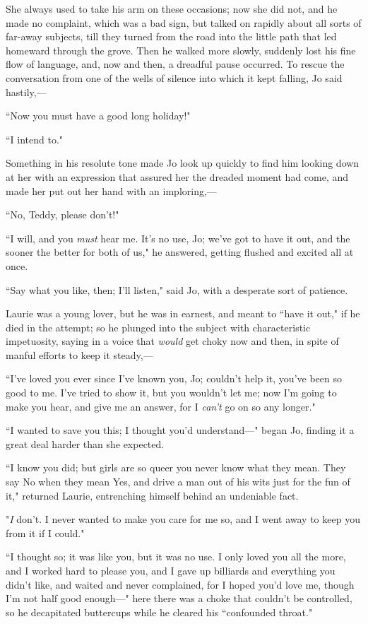 She always used to take his arm on these occasions; now she did not, and
he made no complaint, which was a bad sign, but talked on rapidly about
all sorts of far-away subjects, till they turned from the road into the
little path that led homeward through the grove. Then he walked more
slowly, suddenly lost his fine flow of language, and, now and then, a
dreadful pause occurred. To rescue the conversation from one of the
wells of silence into which it kept falling, Jo said hastily,---

``Now you must have a good long holiday!"

``I intend to."

Something in his resolute tone made Jo look up quickly to find him
looking down at her with an expression that assured her the dreaded
moment had come, and made her put out her hand with an imploring,---

``No, Teddy, please don't!"

``I will, and you \emph{must} hear me. It's no use, Jo;
we've got to have it out, and the sooner the better for
both of us," he answered, getting flushed and excited all at once.

``Say what you like, then; I'll listen," said Jo, with a
desperate sort of patience.

Laurie was a young lover, but he was in earnest, and meant to ``have it
out," if he died in the attempt; so he plunged into the subject with
characteristic impetuosity, saying in a voice that \emph{would} get
choky now and then, in spite of manful efforts to keep it steady,---

``I've loved you ever since I've known
you, Jo; couldn't help it, you've been
so good to me. I've tried to show it, but you
wouldn't let me; now I'm going to make
you hear, and give me an answer, for I \emph{can't} go
on so any longer."

``I wanted to save you this; I thought you'd
understand---" began Jo, finding it a great deal harder than she
expected.

``I know you did; but girls are so queer you never know what they mean.
They say No when they mean Yes, and drive a man out of his wits just for
the fun of it," returned Laurie, entrenching himself behind an
undeniable fact.

"\emph{I} don't. I never wanted to make you care for me
so, and I went away to keep you from it if I could."

``I thought so; it was like you, but it was no use. I only loved you all
the more, and I worked hard to please you, and I gave up billiards and
everything you didn't like, and waited and never
complained, for I hoped you'd love me, though
I'm not half good enough---" here there was a choke that
couldn't be controlled, so he decapitated buttercups
while he cleared his ``confounded throat."

